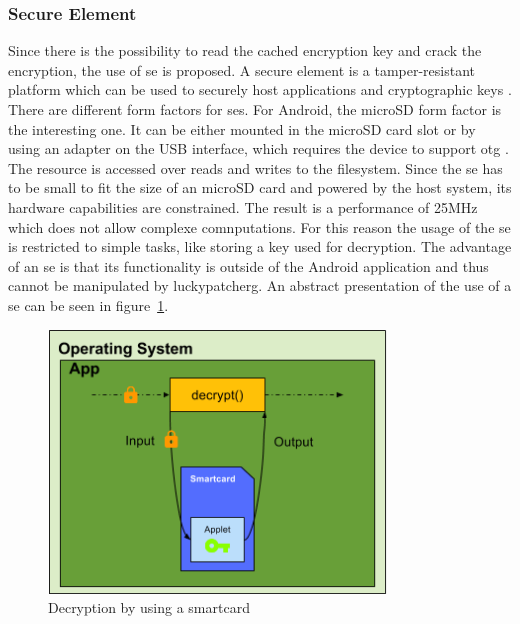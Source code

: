 \subsubsection{Secure Element} \label{section:counter-replace-encryption-key-local}
Since there is the possibility to read the cached encryption key \cite{memoryDump} and crack the encryption, the use of \gls{se} is proposed.
A secure element is a tamper-resistant platform which can be used to securely host applications and cryptographic keys \cite{seDefinition}.
There are different form factors for \gls{se}s.
For Android, the microSD form factor is the interesting one.
It can be either mounted in the microSD card slot or by using an adapter on the USB interface, which requires the device to support \gls{otg} \cite{usbOtg}.
The resource is accessed over reads and writes to the filesystem.
Since the \gls{se} has to be small to fit the size of an microSD card and powered by the host system, its hardware capabilities are constrained.
The result is a performance of 25MHz which does not allow complexe comnputations. \cite{stSe}
\newline
For this reason the usage of the \gls{se} is restricted to simple tasks, like storing a key used for decryption.
The advantage of an \gls{se} is that its functionality is outside of the Android application and thus cannot be manipulated by \gls{luckypatcherg}.
\newline
An abstract presentation of the use of a \gls{se} can be seen in figure~\ref{fig:encryptionKeySmart}.
\newline
\begin{figure}[h]
    \centering
    \includegraphics[width=0.8\textwidth]{data/encryptionKeySmart.png}
    \caption{Decryption by using a smartcard}
    \label{fig:encryptionKeySmart}
\end{figure}
